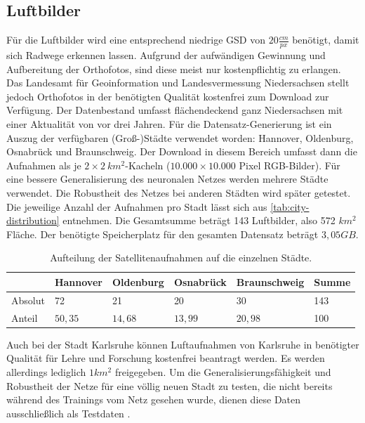 \subsection{Luftbilder}

Für die Luftbilder wird eine entsprechend niedrige \ac{GSD} von $20 \frac{cm}{px}$ benötigt, damit sich Radwege erkennen lassen. 
Aufgrund der aufwändigen Gewinnung und Aufbereitung der Orthofotos, sind diese meist nur kostenpflichtig zu erlangen.
Das Landesamt für Geoinformation und Landesvermessung Niedersachsen stellt jedoch Orthofotos in der benötigten Qualität kostenfrei zum Download zur Verfügung.
Der Datenbestand umfasst flächendeckend ganz Niedersachsen mit einer Aktualität von vor drei Jahren.
Für die Datensatz-Generierung ist ein Auszug der verfügbaren (Groß-)Städte verwendet worden: Hannover, Oldenburg, Osnabrück und Braunschweig. 
Der Download in diesem Bereich umfasst dann die Aufnahmen als je $2{\times}2 ~km^2$-Kacheln ($10.000{\times}10.000$ Pixel RGB-Bilder)\cite{.26.10.2022}.
Für eine bessere Generalisierung des neuronalen Netzes werden mehrere Städte verwendet. Die Robustheit des Netzes 
bei anderen Städten wird später getestet.
Die jeweilige Anzahl der Aufnahmen pro Stadt lässt sich aus \autoref{tab:city-distribution} entnehmen.
Die Gesamtsumme beträgt 143 Luftbilder, also 572 $km^2$ Fläche.
Der benötigte Speicherplatz für den gesamten Datensatz beträgt $3,05 GB$.

\begin{table}
	\centering
	\begin{tabular}{l|l|l|l|l|l}
		& Hannover & Oldenburg & Osnabrück & Braunschweig & Summe\\
		\midrule
		Absolut & 72 & 21 & 20 & 30 & 143\\
		Anteil & $50,35$ & $14,68$ & $13,99$ & $20,98$ & 100 \\
	\end{tabular}
	\caption{Aufteilung der Satellitenaufnahmen auf die einzelnen Städte.}
	\label{tab:city-distribution}
\end{table}

Auch bei der Stadt Karlsruhe können Luftaufnahmen von Karlsruhe in benötigter Qualität für Lehre und Forschung kostenfrei beantragt werden.
Es werden allerdings lediglich $1km^2$ freigegeben.
Um die Generalisierungsfähigkeit und Robustheit der Netze für eine völlig neuen Stadt zu testen, 
die nicht bereits während des Trainings vom Netz gesehen wurde,  
dienen diese Daten ausschließlich als Testdaten \cite{.04.12.2022}.

